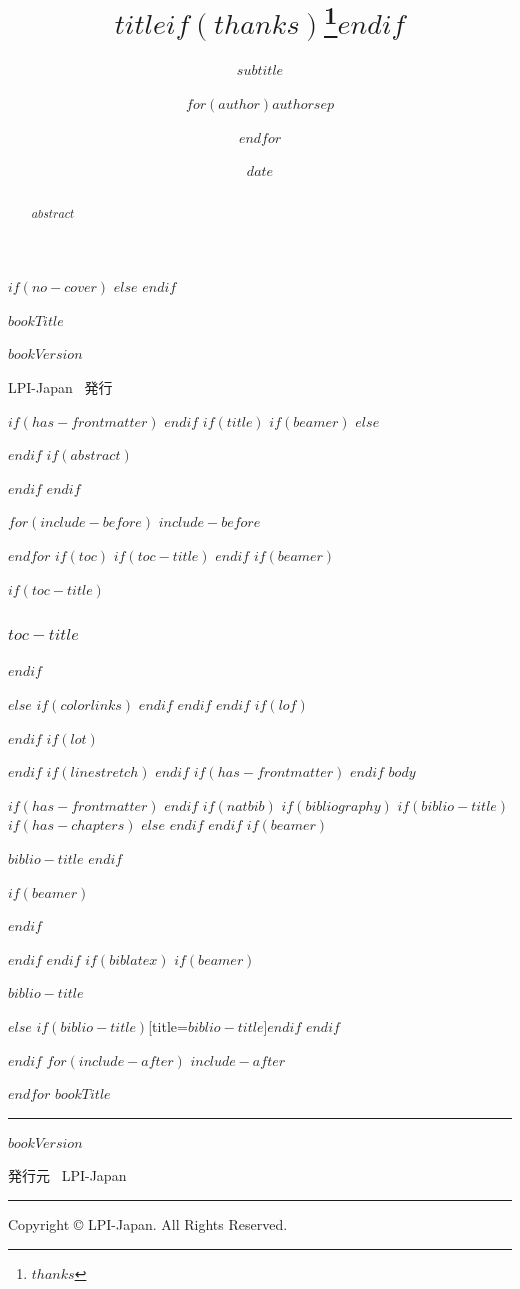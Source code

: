 \documentclass[
$if(fontsize)$
  $fontsize$,
$endif$
$if(papersize)$
  $papersize$paper,
$endif$
$if(beamer)$
  ignorenonframetext,
$if(handout)$
  handout,
$endif$
$if(aspectratio)$
  aspectratio=$aspectratio$,
$endif$
$endif$
$for(classoption)$
  $classoption$$sep$,
$endfor$
]{$documentclass$}
\title{$title$$if(thanks)$\thanks{$thanks$}$endif$}
\subtitle{$subtitle$}
\author{$for(author)$$author$$sep$ \and $endfor$}
\date{$date$}
\institute{$for(institute)$$institute$$sep$ \and $endfor$}
\newif\ifbibliography
\newcounter{none} %
\begin{document}
$if(no-cover)$
$else$
\thispagestyle{empty}
\null
\cleardoublepage
$endif$

\thispagestyle{empty}
\begin{center}
  \vspace*{6cm}
  {\Huge $bookTitle$}

  \vfill

  {\Large $bookVersion$}

  {\Large LPI-Japan \, 発行}

  \vspace*{4cm}
\end{center}
\newpage

$if(has-frontmatter)$
\frontmatter
$endif$
$if(title)$
$if(beamer)$
\frame{\titlepage}
$else$
\maketitle
$endif$
$if(abstract)$
\begin{abstract}
$abstract$
\end{abstract}
$endif$
$endif$

$for(include-before)$
$include-before$

$endfor$
\newpage
$if(toc)$
$if(toc-title)$
\renewcommand*\contentsname{$toc-title$}
$endif$
$if(beamer)$
\begin{frame}[allowframebreaks]
$if(toc-title)$
  \frametitle{$toc-title$}
$endif$
  \tableofcontents[hideallsubsections]
\end{frame}
$else$
{
$if(colorlinks)$
\hypersetup{linkcolor=$if(toccolor)$$toccolor$$else$$endif$}
$endif$
\setcounter{tocdepth}{$toc-depth$}
\tableofcontents
\newpage
}
$endif$
$endif$
$if(lof)$
\listoffigures
$endif$
$if(lot)$
\listoftables
$endif$
$if(linestretch)$
$endif$
$if(has-frontmatter)$
\mainmatter
$endif$
$body$

$if(has-frontmatter)$
\backmatter
$endif$
$if(natbib)$
$if(bibliography)$
$if(biblio-title)$
$if(has-chapters)$
\renewcommand\bibname{$biblio-title$}
$else$
\renewcommand\refname{$biblio-title$}
$endif$
$endif$
$if(beamer)$
\begin{frame}[allowframebreaks]{$biblio-title$}
  \bibliographytrue
$endif$
  
$if(beamer)$
\end{frame}
$endif$

$endif$
$endif$
$if(biblatex)$
$if(beamer)$
\begin{frame}[allowframebreaks]{$biblio-title$}
  \bibliographytrue
  \printbibliography[heading=none]
\end{frame}
$else$
\printbibliography$if(biblio-title)$[title=$biblio-title$]$endif$
$endif$

$endif$
$for(include-after)$
$include-after$

$endfor$
\newpage
\thispagestyle{empty}
  \vspace*{\fill}
  {\LARGE $bookTitle$}

  \rule{\textwidth}{0.5pt}

  $bookVersion$

  発行元 \, LPI-Japan

  \rule{\textwidth}{0.5pt}

  Copyright \copyright{} LPI-Japan. All Rights Reserved.

  \vspace*{1cm}
\end{document}
